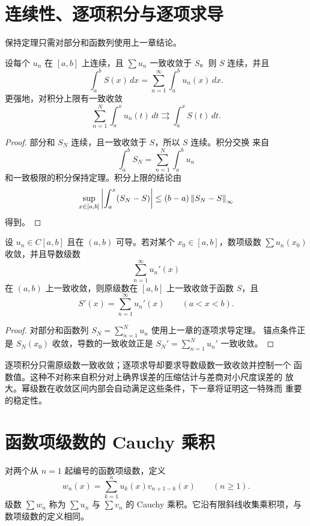 \section{连续性、逐项积分与逐项求导}

保持定理只需对部分和函数列使用上一章结论。

\begin{theorem}[函数项级数的连续性与逐项积分]
\label{thm:function-series-continuity-integration}
设每个 \(u_n\) 在 \([a,b]\) 上连续，且 \(\sum u_n\) 一致收敛于
\(S\)。则 \(S\) 连续，并且
\[
 \int_a^bS(x)\,dx
 =\sum_{n=1}^\infty\int_a^bu_n(x)\,dx.
\]
更强地，对积分上限有一致收敛
\[
 \sum_{n=1}^N\int_a^xu_n(t)\,dt
 \rightrightarrows
 \int_a^xS(t)\,dt.
\]
\end{theorem}

\begin{proof}
部分和 \(S_N\) 连续，且一致收敛于 \(S\)，所以 \(S\) 连续。积分交换
来自
\[
 \int_a^bS_N=\sum_{n=1}^N\int_a^bu_n
\]
和一致极限的积分保持定理。积分上限的结论由
\[
 \sup_{x\in[a,b]}
 \left|\int_a^x(S_N-S)\right|
 \le(b-a)\left\lVert S_N-S\right\rVert_\infty
\]
得到。
\end{proof}

\begin{theorem}[函数项级数的逐项求导]
\label{thm:function-series-differentiation}
设 \(u_n\in C[a,b]\) 且在 \((a,b)\) 可导。若对某个
\(x_0\in[a,b]\)，数项级数 \(\sum u_n(x_0)\) 收敛，并且导数级数
\[
 \sum_{n=1}^\infty u_n'(x)
\]
在 \((a,b)\) 上一致收敛，则原级数在 \([a,b]\) 上一致收敛于函数
\(S\)，且
\[
 S'(x)=\sum_{n=1}^\infty u_n'(x)
 \qquad(a<x<b).
\]
\end{theorem}

\begin{proof}
对部分和函数列 \(S_N=\sum_{n=1}^Nu_n\) 使用上一章的逐项求导定理。
锚点条件正是 \(S_N(x_0)\) 收敛，导数的一致收敛正是
\(S_N'=\sum_{n=1}^Nu_n'\) 一致收敛。
\end{proof}

逐项积分只需原级数一致收敛；逐项求导却要求导数级数一致收敛并控制一个
函数值。这种不对称来自积分对上确界误差的压缩估计与差商对小尺度误差的
放大。幂级数在收敛区间内部会自动满足这些条件，下一章将证明这一特殊而
重要的稳定性。

\section{函数项级数的 Cauchy 乘积}

对两个从 \(n=1\) 起编号的函数项级数，定义
\[
 w_n(x)=\sum_{k=1}^n u_k(x)v_{n+1-k}(x)\qquad(n\ge1).
\]
级数 \(\sum w_n\) 称为 \(\sum u_n\) 与 \(\sum v_n\) 的 Cauchy
乘积。它沿有限斜线收集乘积项，与数项级数的定义相同。

